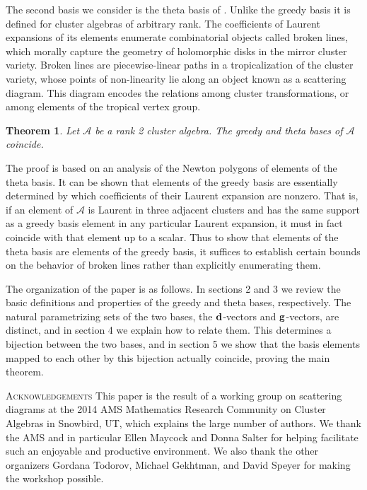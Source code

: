 \documentclass[11pt]{amsart}
\newtheorem{theorem}{Theorem}[section]
\theoremstyle{remark}
\numberwithin{equation}{section}
\newcommand{\bfd}{{\bf d}}
\newcommand{\bfg}{{\bf g}}
\begin{document}
The second basis we consider is the theta basis of \cite{GHKK}.  Unlike the greedy basis it is defined for cluster algebras of arbitrary rank.  The coefficients of Laurent expansions of its elements enumerate combinatorial objects called broken lines, which morally capture the geometry of holomorphic disks in the mirror cluster variety.  Broken lines are piecewise-linear paths in a tropicalization of the cluster variety, whose points of non-linearity lie along an object known as a scattering diagram.  This diagram encodes the relations among cluster transformations, or among elements of the tropical vertex group.

\begin{theorem}
Let $\mathcal{A}$ be a rank 2 cluster algebra.  The greedy and theta bases of $\mathcal{A}$ coincide.
\end{theorem}

The proof is based on an analysis of the Newton polygons of elements of the theta basis.  It can be shown that elements of the greedy basis are essentially determined by which coefficients of their Laurent expansion are nonzero.  That is, if an element of $\mathcal{A}$ is Laurent in three adjacent clusters and has the same support as a greedy basis element in any particular Laurent expansion, it must in fact coincide with that element up to a scalar.  Thus to show that elements of the theta basis are elements of the greedy basis, it suffices to establish certain bounds on the behavior of broken lines rather than explicitly enumerating them.

The organization of the paper is as follows.  In sections 2 and 3 we review the basic definitions and properties of the greedy and theta bases, respectively.  The natural parametrizing sets of the two bases, the $\bfd$-vectors and $\bfg$-vectors, are distinct, and in section 4 we explain how to relate them.  This determines a bijection between the two bases, and in section 5 we show that the basis elements mapped to each other by this bijection actually coincide, proving the main theorem.

\textsc{Acknowledgements} This paper is the result of a working group on scattering diagrams at the 2014 AMS Mathematics Research Community on Cluster Algebras in Snowbird, UT, which explains the large number of authors.  We thank the AMS and in particular Ellen Maycock and Donna Salter for helping facilitate such an enjoyable and productive environment.  We also thank the other organizers Gordana Todorov, Michael Gekhtman, and David Speyer for making the workshop possible.
\end{document}
